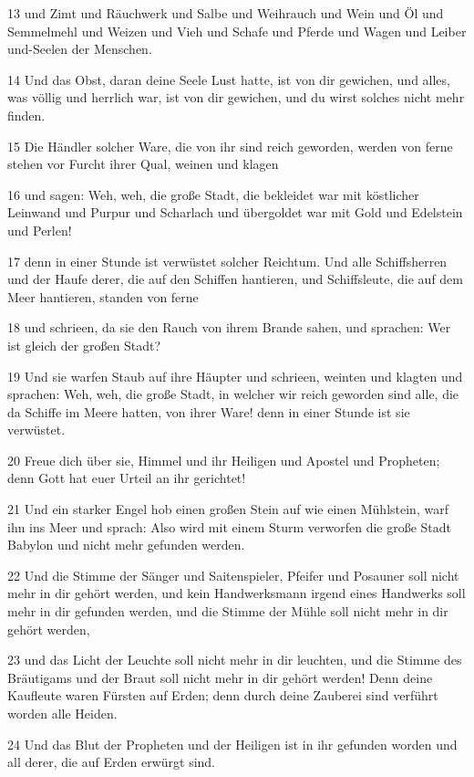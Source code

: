 \par 13 und Zimt und Räuchwerk und Salbe und Weihrauch und Wein und Öl und Semmelmehl und Weizen und Vieh und Schafe und Pferde und Wagen und Leiber und-Seelen der Menschen.
\par 14 Und das Obst, daran deine Seele Lust hatte, ist von dir gewichen, und alles, was völlig und herrlich war, ist von dir gewichen, und du wirst solches nicht mehr finden.
\par 15 Die Händler solcher Ware, die von ihr sind reich geworden, werden von ferne stehen vor Furcht ihrer Qual, weinen und klagen
\par 16 und sagen: Weh, weh, die große Stadt, die bekleidet war mit köstlicher Leinwand und Purpur und Scharlach und übergoldet war mit Gold und Edelstein und Perlen!
\par 17 denn in einer Stunde ist verwüstet solcher Reichtum. Und alle Schiffsherren und der Haufe derer, die auf den Schiffen hantieren, und Schiffsleute, die auf dem Meer hantieren, standen von ferne
\par 18 und schrieen, da sie den Rauch von ihrem Brande sahen, und sprachen: Wer ist gleich der großen Stadt?
\par 19 Und sie warfen Staub auf ihre Häupter und schrieen, weinten und klagten und sprachen: Weh, weh, die große Stadt, in welcher wir reich geworden sind alle, die da Schiffe im Meere hatten, von ihrer Ware! denn in einer Stunde ist sie verwüstet.
\par 20 Freue dich über sie, Himmel und ihr Heiligen und Apostel und Propheten; denn Gott hat euer Urteil an ihr gerichtet!
\par 21 Und ein starker Engel hob einen großen Stein auf wie einen Mühlstein, warf ihn ins Meer und sprach: Also wird mit einem Sturm verworfen die große Stadt Babylon und nicht mehr gefunden werden.
\par 22 Und die Stimme der Sänger und Saitenspieler, Pfeifer und Posauner soll nicht mehr in dir gehört werden, und kein Handwerksmann irgend eines Handwerks soll mehr in dir gefunden werden, und die Stimme der Mühle soll nicht mehr in dir gehört werden,
\par 23 und das Licht der Leuchte soll nicht mehr in dir leuchten, und die Stimme des Bräutigams und der Braut soll nicht mehr in dir gehört werden! Denn deine Kaufleute waren Fürsten auf Erden; denn durch deine Zauberei sind verführt worden alle Heiden.
\par 24 Und das Blut der Propheten und der Heiligen ist in ihr gefunden worden und all derer, die auf Erden erwürgt sind.

